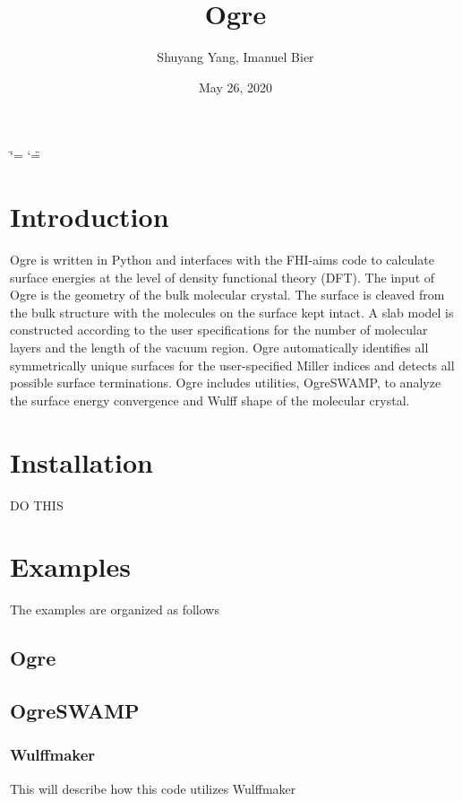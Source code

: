 \documentclass[letterpaper,10pt,english,openany,oneside]{sphinxmanual}
\title{Ogre}
\date{May 26, 2020}
\author{Shuyang Yang, Imanuel Bier}
\begin{document}
\ifdefined\shorthandoff
  \ifnum\catcode`\=\string=\active\shorthandoff{=}\fi
  \ifnum\catcode`\"=\active{}\fi
\fi

\pagestyle{empty}
\sphinxmaketitle
\pagestyle{plain}
\sphinxtableofcontents
\pagestyle{normal}
\label{\detokenize{index::doc}}



\chapter{Introduction}
\label{\detokenize{index:introduction}}
Ogre is written in Python and interfaces with the FHI-aims code to calculate surface energies at the level of density functional theory (DFT). The input of Ogre is the geometry of the bulk molecular crystal. The surface is cleaved from the bulk structure with the molecules on the surface kept intact. A slab model is constructed according to the user specifications for the number of molecular layers and the length of the vacuum region. Ogre automatically identifies all symmetrically unique surfaces for the user-specified Miller indices and detects all possible surface terminations. Ogre includes utilities, OgreSWAMP, to analyze the surface energy convergence and Wulff shape of the molecular crystal.


\chapter{Installation}
\label{\detokenize{index:installation}}
DO THIS


\chapter{Examples}
\label{\detokenize{index:examples}}
The examples are organized as follows


\section{Ogre}
\label{\detokenize{index:id1}}

\section{OgreSWAMP}
\label{\detokenize{index:ogreswamp}}

\subsection{Wulffmaker}
\label{\detokenize{index:wulffmaker}}
This will describe how this code utilizes Wulffmaker
\end{document}

